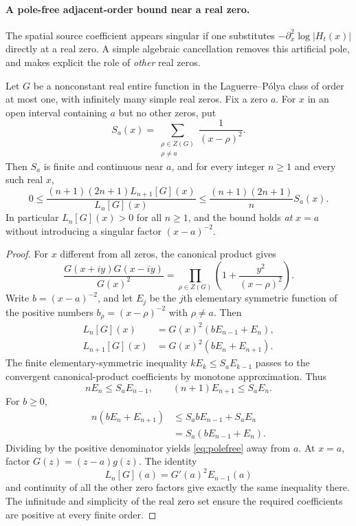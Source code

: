 \paragraph{A pole-free adjacent-order bound near a real zero.}
The spatial source coefficient appears singular if one
substitutes $-\partial_x^2\log|H_t(x)|$ directly at
a real zero. A simple algebraic cancellation removes
this artificial pole, and makes explicit the role
of \emph{other} real zeros.

\begin{proposition}\label{prop:polefree}
Let $G$ be a nonconstant real entire function
in the Laguerre--P\'olya class of order at most
one, with infinitely many simple real zeros.
Fix a zero $a$. For $x$ in an open interval
containing $a$ but no other zeros, put
\[
S_a(x)=\sum_{\substack{\rho\in Z(G)\\\rho\ne a}}
\frac{1}{(x-\rho)^2}.
\]
Then $S_a$ is finite and continuous near $a$,
and for every integer $n\ge1$ and every such
real $x$,
\begin{equation}\label{eq:polefree}
\boxed{\quad
0\le
\frac{(n+1)(2n+1)L_{n+1}[G](x)}
{L_n[G](x)}
\le\frac{(n+1)(2n+1)}{n}S_a(x).
\quad}
\end{equation}
In particular $L_n[G](x)>0$ for all $n\ge1$,
and the bound holds \emph{at} $x=a$ without
introducing a singular factor $(x-a)^{-2}$.
\end{proposition}
\begin{proof}
For $x$ different from all zeros, the canonical
product gives
\[
\frac{G(x+iy)G(x-iy)}{G(x)^2}
=\prod_{\rho\in Z(G)}
\left(1+\frac{y^2}{(x-\rho)^2}\right).
\]
Write $b=(x-a)^{-2}$, and let $E_j$ be the
$j$th elementary symmetric function of
the positive numbers
$b_\rho=(x-\rho)^{-2}$ with $\rho\ne a$.
Then
\begin{align*}
L_n[G](x)&=G(x)^2(bE_{n-1}+E_n),\\
L_{n+1}[G](x)&=G(x)^2(bE_n+E_{n+1}).
\end{align*}
The finite elementary-symmetric inequality
$kE_k\le S_aE_{k-1}$ passes to the convergent
canonical-product coefficients by monotone
approximation. Thus
\[
nE_n\le S_aE_{n-1},\qquad
(n+1)E_{n+1}\le S_aE_n.
\]
For $b\ge0$,
\begin{align*}
n(bE_n+E_{n+1})
&\le S_a bE_{n-1}+S_a E_n\\
&=S_a(bE_{n-1}+E_n).
\end{align*}
Dividing by the positive denominator yields
\eqref{eq:polefree} away from $a$.
At $x=a$, factor $G(z)=(z-a)g(z)$.
The identity
\[
L_n[G](a)=G'(a)^2E_{n-1}(a)
\]
and continuity of all the other zero factors
give exactly the same inequality there.
The infinitude and simplicity of the real
zero set ensure the required coefficients
are positive at every finite order.
\end{proof}


